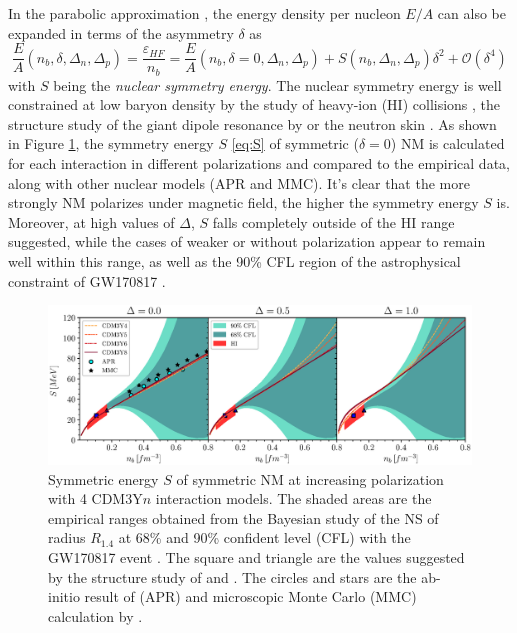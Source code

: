 In the parabolic approximation \citep{khoa1996study}, the energy density per nucleon $E/A$ can also be expanded in terms of the asymmetry $\delta$ as
\begin{equation}
    \frac{E}{A} (n_b, \delta, \Delta_n, \Delta_p) = \frac{\varepsilon_{HF}}{n_b} = \frac{E}{A} (n_b, \delta=0, \Delta_n, \Delta_p) + S(n_b, \Delta_n, \Delta_p)\delta^2 + \mathcal{O}(\delta^4)
    \label{eq:S}
\end{equation}
with $S$ being the \emph{nuclear symmetry energy}. The nuclear symmetry energy is well constrained at low baryon density by the study of heavy-ion (\gls{HI}) collisions \citep{tsang2011constraints,ono2003isospin}, the structure study of the giant dipole resonance by \cite{trippa2008giant} or the neutron skin \citep{furnstahl2002neutron}. As shown in Figure \ref{fig:s}, the symmetry energy $S$ \eqref{eq:S} of symmetric ($\delta = 0$) \gls{NM} is calculated for each interaction in different polarizations and compared to the empirical data, along with other nuclear models (\gls{APR} and \gls{MMC}). It's clear that the more strongly \gls{NM} polarizes under magnetic field, the higher the symmetry energy $S$ is. Moreover, at high values of $\Delta$, $S$ falls completely outside of the \gls{HI} range suggested, while the cases of weaker or without polarization appear to remain well within this range, as well as the 90\% \gls{CFL} region of the astrophysical constraint of GW170817 \citep{xie2019bayesian}.\par

\begin{figure}[ht!]
        \centering
        \includegraphics[width=\textwidth]{fig/S.eps}
        \caption{Symmetric energy $S$ of symmetric \gls{NM} at increasing polarization with 4 CDM3Y$n$ interaction models. The shaded areas are the empirical ranges obtained from the Bayesian study \citep{xie2019bayesian} of the \gls{NS} of radius $R_{1.4}$ at 68\% and 90\% confident level (\gls{CFL}) with the GW170817 event \citep{abbott2018gw170817}. The square and triangle are the values suggested by the structure study of \cite{trippa2008giant} and \cite{furnstahl2002neutron}. The circles and stars are the ab-initio result of \cite{akmal1998equation} (\gls{APR}) and microscopic Monte Carlo (\gls{MMC}) calculation by \cite{gandolfi2010microscopic}.}
        \label{fig:s}
\end{figure}

